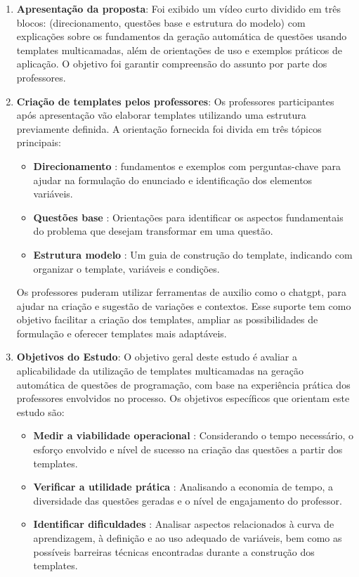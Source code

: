 \begin{enumerate}
    \item \textbf{Apresentação da proposta}:  Foi exibido um vídeo curto dividido em três blocos: (direcionamento, questões base e estrutura do modelo) com explicações sobre os fundamentos da geração automática de questões usando templates multicamadas, além de orientações de uso e exemplos práticos de aplicação. O objetivo foi garantir  compreensão do assunto por parte dos professores.
    
    \item \textbf{Criação de templates pelos professores}:  Os professores participantes após apresentação vão elaborar templates utilizando uma estrutura previamente definida. A orientação fornecida foi divida em três tópicos principais:
    \begin{itemize}
        \item \textbf{Direcionamento} : fundamentos e exemplos com perguntas-chave para ajudar na formulação do enunciado e identificação dos elementos variáveis.
        \item \textbf{Questões base} : Orientações para identificar os aspectos fundamentais do problema que desejam transformar em uma questão.
        \item \textbf{Estrutura modelo} : Um guia de construção do template, indicando com organizar o template, variáveis e condições.
    \end{itemize}

Os professores puderam utilizar ferramentas de auxilio como o \gls{chatgpt}, para ajudar na criação e sugestão de variações e contextos. Esse suporte tem como objetivo facilitar a criação dos templates, ampliar as possibilidades de formulação e oferecer templates mais adaptáveis.

    \item \textbf{Objetivos do Estudo}:  O objetivo geral deste estudo é avaliar a aplicabilidade da utilização de templates multicamadas na geração automática de questões de programação, com base na experiência prática dos professores envolvidos no processo. Os objetivos específicos que orientam este estudo são:

       \begin{itemize}
        \item \textbf{Medir a viabilidade operacional} : Considerando o tempo necessário, o esforço envolvido e nível de sucesso na criação das questões a partir dos templates.
        \item \textbf{Verificar a utilidade prática} : Analisando a economia de tempo, a diversidade das questões geradas e o nível de engajamento do professor.
        \item \textbf{Identificar dificuldades} : Analisar aspectos relacionados à curva de aprendizagem, à definição e ao uso adequado de variáveis, bem como as possíveis barreiras técnicas encontradas durante a construção dos templates. 
    \end{itemize}
    

\end{enumerate}
